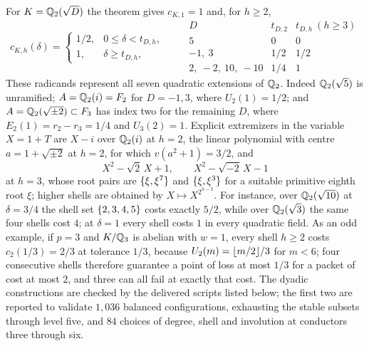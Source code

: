 \begin{example}\label{cost:ex:quadratic}
For $K=\mathbb{Q}_2(\sqrt D)$ the theorem gives $c_{K,1}=1$ and, for $h\ge2$,
\[
 c_{K,h}(\delta)=
 \begin{cases}1/2,&0\le\delta<t_{D,h},\\1,&\delta\ge t_{D,h},\end{cases}
\qquad
\begin{array}{c|cc}
D&t_{D,2}&t_{D,h}\ (h\ge3)\\\hline
5&0&0\\
-1,\ 3&1/2&1/2\\
2,\ -2,\ 10,\ -10&1/4&1
\end{array}
\]
These radicands represent all seven quadratic extensions of $\mathbb{Q}_2$. Indeed
$\mathbb{Q}_2(\sqrt5)$ is unramified; $A=\mathbb{Q}_2(i)=F_2$ for $D=-1,3$, where
$U_2(1)=1/2$; and $A=\mathbb{Q}_2(\sqrt{\pm2})\subset F_3$ has index two for the remaining $D$,
where $E_2(1)=r_2-r_3=1/4$ and $U_3(2)=1$. Explicit extremizers in the variable $X=1+T$
are $X-i$ over $\mathbb{Q}_2(i)$ at $h=2$, the linear polynomial with centre $a=1+\sqrt{\pm2}$ at
$h=2$, for which $v(a^2+1)=3/2$, and
\[
 X^2-\sqrt2\,X+1,\qquad X^2-\sqrt{-2}\,X-1
\]
at $h=3$, whose root pairs are $\{\xi,\xi^7\}$ and $\{\xi,\xi^3\}$ for a suitable
primitive eighth root $\xi$; higher shells are obtained by $X\mapsto X^{2^{h-3}}$. For
instance, over $\mathbb{Q}_2(\sqrt{10})$ at $\delta=3/4$ the shell set $\{2,3,4,5\}$ costs
exactly $5/2$, while over $\mathbb{Q}_2(\sqrt3)$ the same four shells cost $4$; at $\delta=1$
every shell costs $1$ in every quadratic field. As an odd example, if $p=3$ and
$K/\mathbb{Q}_3$ is abelian with $w=1$, every shell $h\ge2$ costs $c_2(1/3)=2/3$ at tolerance
$1/3$, because $U_2(m)=\lfloor m/2\rfloor/3$ for $m<6$; four consecutive shells therefore
guarantee a point of loss at most $1/3$ for a packet of cost at most $2$, and three can all
fail at exactly that cost. The dyadic constructions are checked by the delivered scripts
listed below; the first two are reported to validate $1{,}036$ balanced configurations,
exhausting the stable subsets through level five, and $84$ choices of degree, shell and
involution at conductors three through six.
\end{example}

